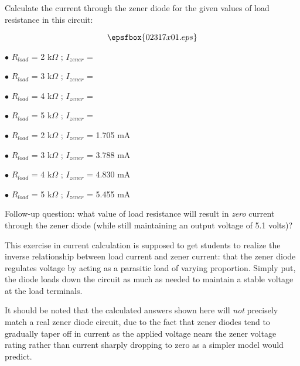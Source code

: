 

Calculate the current through the zener diode for the given values of load resistance in this circuit:

$$\epsfbox{02317x01.eps}$$

\medskip
\goodbreak
\item{$\bullet$} $R_{load}$ = 2 k$\Omega$ ; $I_{zener}$ =
\item{$\bullet$} $R_{load}$ = 3 k$\Omega$ ; $I_{zener}$ =
\item{$\bullet$} $R_{load}$ = 4 k$\Omega$ ; $I_{zener}$ =
\item{$\bullet$} $R_{load}$ = 5 k$\Omega$ ; $I_{zener}$ =
\medskip







\medskip
\goodbreak
\item{$\bullet$} $R_{load}$ = 2 k$\Omega$ ; $I_{zener}$ = 1.705 mA
\item{$\bullet$} $R_{load}$ = 3 k$\Omega$ ; $I_{zener}$ = 3.788 mA
\item{$\bullet$} $R_{load}$ = 4 k$\Omega$ ; $I_{zener}$ = 4.830 mA
\item{$\bullet$} $R_{load}$ = 5 k$\Omega$ ; $I_{zener}$ = 5.455 mA
\medskip

\vskip 10pt

Follow-up question: what value of load resistance will result in {\it zero} current through the zener diode (while still maintaining an output voltage of 5.1 volts)?







This exercise in current calculation is supposed to get students to realize the inverse relationship between load current and zener current: that the zener diode regulates voltage by acting as a parasitic load of varying proportion.  Simply put, the diode loads down the circuit as much as needed to maintain a stable voltage at the load terminals.

It should be noted that the calculated answers shown here will {\it not} precisely match a real zener diode circuit, due to the fact that zener diodes tend to gradually taper off in current as the applied voltage nears the zener voltage rating rather than current sharply dropping to zero as a simpler model would predict.

